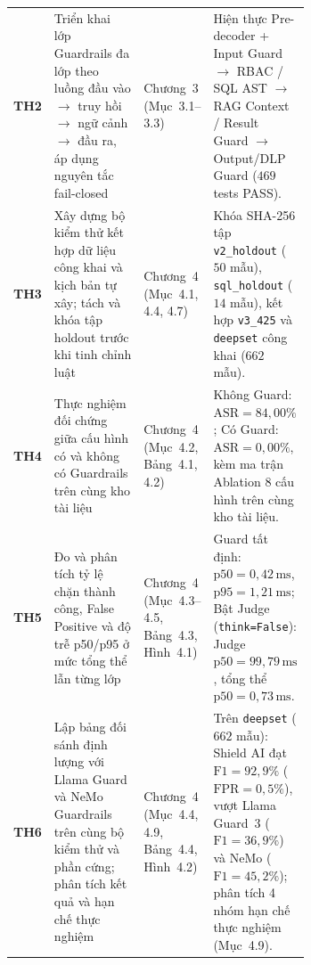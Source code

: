 \begin{table}[!htbp]
\begin{tabularx}{\linewidth}{@{}C{0.06\linewidth}L{0.42\linewidth}L{0.18\linewidth}X@{}}
\textbf{TH2} & Triển khai lớp Guardrails đa lớp theo luồng đầu vào $\rightarrow$ truy hồi $\rightarrow$ ngữ cảnh $\rightarrow$ đầu ra, áp dụng nguyên tắc fail-closed & Chương~3 (Mục~3.1--3.3) & Hiện thực Pre-decoder + Input Guard $\rightarrow$ RBAC / SQL AST $\rightarrow$ RAG Context / Result Guard $\rightarrow$ Output/DLP Guard ($469$ tests PASS). \\
\textbf{TH3} & Xây dựng bộ kiểm thử kết hợp dữ liệu công khai và kịch bản tự xây; tách và khóa tập holdout trước khi tinh chỉnh luật & Chương~4 (Mục~4.1, 4.4, 4.7) & Khóa SHA-256 tập \texttt{v2\_\allowbreak holdout} ($50$ mẫu), \texttt{sql\_\allowbreak holdout} ($14$ mẫu), kết hợp \texttt{v3\_425} và \texttt{deepset} công khai ($662$ mẫu). \\
\textbf{TH4} & Thực nghiệm đối chứng giữa cấu hình có và không có Guardrails trên cùng kho tài liệu & Chương~4 (Mục~4.2, Bảng~4.1, 4.2) & Không Guard: $\text{ASR}=84{,}00\%$; Có Guard: $\text{ASR}=0{,}00\%$, kèm ma trận Ablation 8 cấu hình trên cùng kho tài liệu. \\
\textbf{TH5} & Đo và phân tích tỷ lệ chặn thành công, False Positive và độ trễ p50/p95 ở mức tổng thể lẫn từng lớp & Chương~4 (Mục~4.3--4.5, Bảng~4.3, Hình~4.1) & Guard tất định: $\text{p50}=0{,}42\,\text{ms}$, $\text{p95}=1{,}21\,\text{ms}$; Bật Judge (\texttt{think=False}): Judge $\text{p50}=99{,}79\,\text{ms}$, tổng thể $\text{p50}=0{,}73\,\text{ms}$. \\
\textbf{TH6} & Lập bảng đối sánh định lượng với Llama Guard và NeMo Guardrails trên cùng bộ kiểm thử và phần cứng; phân tích kết quả và hạn chế thực nghiệm & Chương~4 (Mục~4.4, 4.9, Bảng~4.4, Hình~4.2) & Trên \texttt{deepset} ($662$ mẫu): Shield AI đạt $\text{F1}=92{,}9\%$ ($\text{FPR}=0{,}5\%$), vượt Llama Guard~3 ($\text{F1}=36{,}9\%$) và NeMo ($\text{F1}=45{,}2\%$); phân tích 4 nhóm hạn chế thực nghiệm (Mục~4.9). \\
\bottomrule
\end{tabularx}
\end{table}
